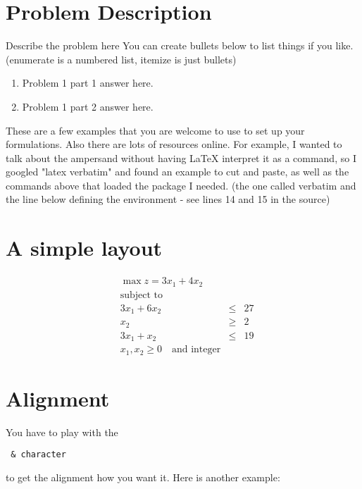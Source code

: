 \documentclass[12pt,letterpaper]{article}
\begin{document}
\section{Problem Description}

Describe the problem here
You can create bullets below to list things if you like. (enumerate is a numbered list, itemize is just bullets)
\begin{enumerate}
  \item
   Problem 1 part 1 answer here.
  \item
    Problem 1 part 2 answer here.
\end{enumerate}

 These are a few examples that you are welcome to use to set up your formulations. Also there are lots of resources online. For example, I wanted to talk about the ampersand without having LaTeX interpret it as a command, so I googled "latex verbatim" and found an example to cut and paste, as well as the commands above that loaded the package I needed. (the one called verbatim and the line below defining the environment - see lines 14 and 15 in the source)

\section{A simple layout} 

$$\begin{align*}
    & \max z = 3x_1 + 4x_2  \\
    &\text{subject to} &&\\
    & 3x_1 + 6x_2  &\leq& 27\\
    & x_2 &\geq& 2\\
    & 3x_1 + x_2 &\leq& 19 \\
    & x_1, x_2 \geq 0 \quad \text{and integer}
\end{align*}$$

\section{ Alignment}
You have to play with the
\begin{verbatim} & character \end{verbatim} 
to get the alignment how you want it. Here is another example:
\end{document}
